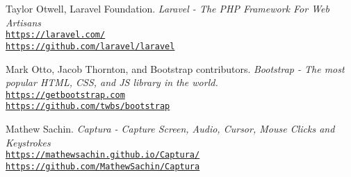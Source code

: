 \documentclass{article}
\begin{document}
    \begin{thebibliography}{5}
        Taylor Otwell, Laravel Foundation.
        \textit{Laravel - The PHP Framework For Web Artisans}\\
        \texttt{\href{https://laravel.com/}{https://laravel.com/}}\\
        \texttt{\href{https://github.com/laravel/laravel}{https://github.com/laravel/laravel}}


        Mark Otto, Jacob Thornton, and Bootstrap contributors.
        \textit{Bootstrap - The most popular HTML, CSS, and JS library in the world.}\\
        \texttt{\href{https://getbootstrap.com}{https://getbootstrap.com}}\\
        \texttt{\href{https://github.com/twbs/bootstrap}{https://github.com/twbs/bootstrap}}

        Mathew Sachin.
        \textit{Captura - Capture Screen, Audio, Cursor, Mouse Clicks and Keystrokes}\\
        \texttt{\href{https://mathewsachin.github.io/Captura/}{https://mathewsachin.github.io/Captura/}}\\
        \texttt{\href{https://github.com/MathewSachin/Captura}{https://github.com/MathewSachin/Captura}}
    \end{thebibliography}
\end{document}

